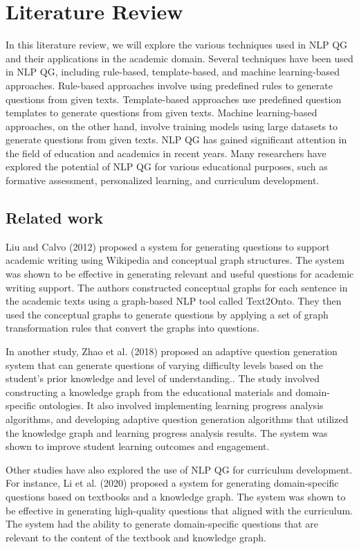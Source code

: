 \documentclass[12pt]{report}
\begin{document}
\chapter{Literature Review}
In this literature review, we will explore the various techniques used in NLP QG and their applications in the academic domain. Several techniques have been used in NLP QG, including rule-based, template-based, and machine learning-based approaches. Rule-based approaches involve using predefined rules to generate questions from given texts. Template-based approaches use predefined question templates to generate questions from given texts. Machine learning-based approaches, on the other hand, involve training models using large datasets to generate questions from given texts. NLP QG has gained significant attention in the field of education and academics in recent years. Many researchers have explored the potential of NLP QG for various educational purposes, such as formative assessment, personalized learning, and curriculum development.

\section{Related work}
Liu and Calvo (2012) proposed a system for generating questions to support academic writing using Wikipedia and conceptual graph structures.{\cite{liu2012}} The system was shown to be effective in generating relevant and useful questions for academic writing support. The authors constructed conceptual graphs for each sentence in the academic texts using a graph-based NLP tool called Text2Onto. They then used the conceptual graphs to generate questions by applying a set of graph transformation rules that convert the graphs into questions. 

In another study, Zhao et al. (2018) proposed an adaptive question generation system that can generate questions of varying difficulty levels based on the student's prior knowledge and level of understanding.\cite{zhao2018}. The study involved constructing a knowledge graph from the educational materials and domain-specific ontologies. It also involved implementing learning progress analysis algorithms, and developing adaptive question generation algorithms that utilized the knowledge graph and learning progress analysis results. The system was shown to improve student learning outcomes and engagement.

Other studies have also explored the use of NLP QG for curriculum development. For instance, Li et al. (2020) proposed a system for generating domain-specific questions based on textbooks and a knowledge graph.\cite{li2020} The system was shown to be effective in generating high-quality questions that aligned with the curriculum. The system had the ability to generate domain-specific questions that are relevant to the content of the textbook and knowledge graph.
\end{document}
